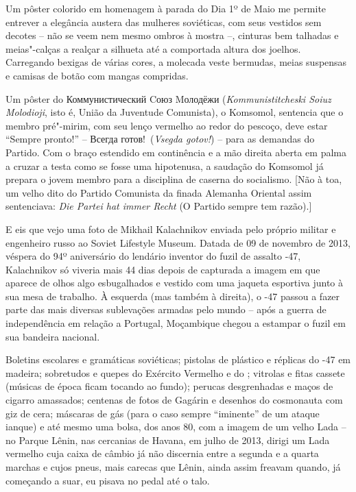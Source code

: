 Um pôster colorido em homenagem à parada do Dia 1º de Maio me permite
entrever a elegância austera das mulheres soviéticas, com seus vestidos
sem decotes -- não se veem nem mesmo ombros à mostra --, cinturas bem
talhadas e meias"-calças a realçar a silhueta até a comportada altura dos
joelhos. Carregando bexigas de várias cores, a molecada veste bermudas,
meias suspensas e camisas de botão com mangas compridas.

Um pôster do Коммунистический Cоюз Mолодёжи (\emph{Kommunistitcheski
Soiuz Molodioji}, isto é, União da Juventude Comunista), o Komsomol,
sentencia que o membro pré"-mirim, com seu lenço vermelho ao redor do
pescoço, deve estar ``Sempre pronto!'' -- Всегда готов!~(\emph{Vsegda
gotov!}) -- para as demandas do Partido. Com o braço estendido em
continência e a mão direita aberta em palma a cruzar a testa como se
fosse uma hipotenusa, a saudação do Komsomol já prepara o jovem membro
para a disciplina de caserna do socialismo. {[}Não à toa, um velho dito
do Partido Comunista da finada Alemanha Oriental assim sentenciava:
\emph{Die Partei hat immer Recht} (O Partido sempre tem razão).{]}

E eis que vejo uma foto de Mikhail Kalachnikov enviada pelo próprio
militar e engenheiro russo ao Soviet Lifestyle Museum. Datada de 09 de
novembro de 2013, véspera do 94º aniversário do lendário inventor do
fuzil de assalto -47, Kalachnikov só viveria mais 44 dias depois de
capturada a imagem em que aparece de olhos algo esbugalhados e vestido
com uma jaqueta esportiva junto à sua mesa de trabalho. À esquerda (mas
também à direita), o -47 passou a fazer parte das mais diversas
sublevações armadas pelo mundo -- após a guerra de independência em
relação a Portugal, Moçambique chegou a estampar o fuzil em sua bandeira
nacional.

Boletins escolares e gramáticas soviéticas; pistolas de plástico e
réplicas do -47 em madeira; sobretudos e quepes do Exército Vermelho e
do ; vitrolas e fitas cassete (músicas de época ficam tocando ao
fundo); perucas desgrenhadas e maços de cigarro amassados; centenas de
fotos de Gagárin e desenhos do cosmonauta com giz de cera; máscaras de
gás (para o caso sempre ``iminente'' de um ataque ianque) e até mesmo
uma bolsa, dos anos 80, com a imagem de um velho Lada -- no Parque
Lênin, nas cercanias de Havana, em julho de 2013, dirigi um Lada
vermelho cuja caixa de câmbio já não discernia entre a segunda e a
quarta marchas e cujos pneus, mais carecas que Lênin, ainda assim
freavam quando, já começando a suar, eu pisava no pedal até o talo.

